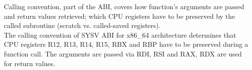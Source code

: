 Calling convention, part of the ABI, covers how function's arguments are passed
and return values retrieved; which CPU registers have to be preserved by the
called subroutine (scratch vs. called-saved registers).\\

The calling convention of SYSV ABI for x86_64 architecture determines that CPU
registers R12, R13, R14, R15, RBX and RBP have to be preserved during a function
call. The arguments are passed via RDI, RSI and RAX, RDX are used for return
values.
